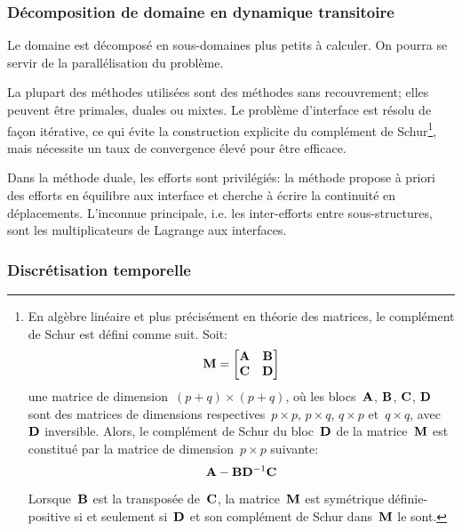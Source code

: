 \medskip
\subsubsection{Décomposition de domaine en dynamique transitoire}\label{Sec-Schur}

Le domaine est décomposé en sous-domaines plus petits à calculer. On pourra se servir de la parallélisation du problème. 

La plupart des méthodes utilisées sont des méthodes sans recouvrement; elles peuvent être primales, duales ou mixtes. Le problème d'interface est résolu de façon itérative, ce qui évite la construction explicite du complément de Schur\footnote{En algèbre linéaire et plus précisément en théorie des matrices, le complément de Schur est défini comme suit. Soit:
\begin{equation} \MM{M}=\MM*{\MM{A} & \MM{B} \\ \MM{C} & \MM{D}} \end{equation}
une matrice de dimension~$(p+q)\times(p+q)$, où les blocs~$\MM{A}$, $\MM{B}$, $\MM{C}$, $\MM{D}$ sont des matrices de dimensions respectives~$p\times p$, $p\times q$, $q\times p$ et~$q\times q$, avec~$\MM{D}$ inversible.
Alors, le complément de Schur du bloc~$\MM{D}$ de la matrice~$\MM{M}$ est constitué par la matrice de dimension~$p\times p$ suivante:
\begin{equation} \MM{A}-\MM{B}\MMI{D}\MM{C}\end{equation}

Lorsque~$\MM{B}$ est la transposée de~$\MM{C}$, la matrice~$\MM{M}$ est symétrique définie-positive si et seulement si~$\MM{D}$ et son complément de Schur dans~$\MM{M}$ le sont.}, mais nécessite un taux de convergence élevé pour être efficace.

Dans la méthode duale, les efforts sont privilégiés: la méthode propose à priori des efforts en équilibre aux interface et cherche à écrire la continuité en déplacements. L'inconnue principale, i.e. les inter-efforts entre sous-structures, sont les multiplicateurs de Lagrange aux interfaces.

\medskip
\subsubsection{Discrétisation temporelle}

